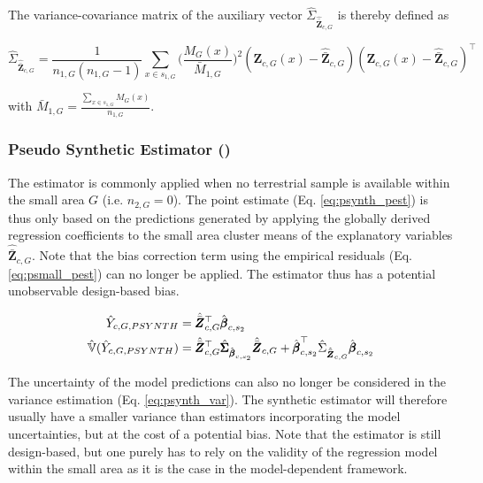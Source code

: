 The variance-covariance matrix of the auxiliary vector $\hat{\Sigma}_{\hat{\bar{\pmb{Z}}}_{c,G}}$ is thereby defined as
	
\begin{equation}\label{estvarcovaux_G}
\hat{\Sigma}_{\hat{\bar{\pmb{Z}}}_{c,G}} = \frac{1}{n_{1,G}(n_{1,G}-1)} \sum_{x \in s_{1,G}} \big(\frac{M_{G}(x)}{\bar{M}_{1,G}}\big)^2 (\pmb{Z}_{c,G}(x)-\hat{\bar{\pmb{Z}}}_{c,G})(\pmb{Z}_{c,G}(x)-\hat{\bar{\pmb{Z}}}_{c,G})^{\top}
\end{equation}

with $\bar{M}_{1,G}=\frac{\sum_{x \in s_{1,G}}M_{G}(x)}{n_{1,G}}$.\\



\subsubsection{Pseudo Synthetic Estimator (\psynth{})}
\label{sec:psynth}

The \psynth{} estimator is commonly applied when no terrestrial sample is available within the small area $G$ (i.e. $n_{2,G}=0$). The point estimate (Eq. \ref{eq:psynth_pest}) is thus only based on the predictions generated by applying the globally derived regression coefficients to the small area cluster means of the explanatory variables $\hat{\bar{\pmb{Z}}}_{c,G}$. Note that the bias correction term using the empirical residuals (Eq. \ref{eq:psmall_pest}) can no longer be applied. The \psynth{} estimator thus has a potential unobservable design-based bias.

\begin{subequations}\label{eq:psynth}
	\begin{align}
	\hat{Y}_{c,G,PSYNTH} & =\hat{\bar{\pmb{Z}}}_{c,G}^{\top}\hat{\pmb{\beta}}_{c,s_2} \label{eq:psynth_pest} \\
	\hat{\mathbb{V}}(\hat{Y}_{c,G,PSYNTH})& =
	\hat{\bar{\pmb{Z}}}_{c,G}^{\top}\hat{\pmb{\Sigma}}_{\hat{\pmb{\beta}}_{c,s_2}}
	\hat{\bar{\pmb{Z}}}_{c,G}
	+ \hat{\pmb{\beta}}^{\top}_{c,s_2}\hat{\Sigma}_{\hat{\bar{\pmb{Z}}}_{c,G}}\hat{\pmb{\beta}}_{c,s_2} \label{eq:psynth_var}
	\end{align}
\end{subequations}

The uncertainty of the model predictions can also no longer be considered in the variance estimation (Eq. \ref{eq:psynth_var}). The synthetic estimator will therefore usually have a smaller variance than estimators incorporating the model uncertainties, but at the cost of a potential bias. Note that the \psynth{} estimator is still design-based, but one purely has to rely on the validity of the regression model within the small area as it is the case in the model-dependent framework.\\

